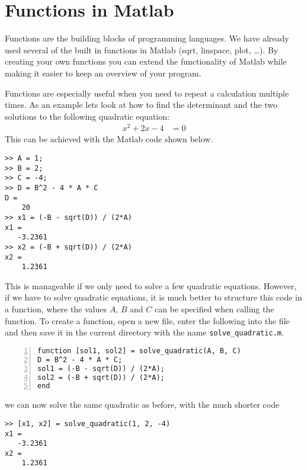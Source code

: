 \section{Functions in Matlab}

Functions are the building blocks of programming languages.
We have already used several of the built in functions 
in Matlab (sqrt, linspace, plot, \ldots). 
By creating your own functions you can extend the functionality of 
Matlab while making it easier to keep an overview of your program.

Functions are especially useful when you need to repeat a calculation 
multiple times.
As an example lets look at how to find the determinant and the two solutions 
to the following quadratic equation: 
\begin{align*}
x^2 + 2x - 4 &= 0 
\end{align*}
This can be achieved with the Matlab code shown below.
\begin{lstlisting}
>> A = 1; 
>> B = 2; 
>> C = -4;
>> D = B^2 - 4 * A * C
D =
    20
>> x1 = (-B - sqrt(D)) / (2*A)
x1 =
   -3.2361
>> x2 = (-B + sqrt(D)) / (2*A)
x2 =
    1.2361
\end{lstlisting}
This is manageable if we only need to solve a few quadratic equations.
However, if we have to solve quadratic equations, it is much better to 
structure this code in a function, where the values $A$, $B$ and $C$ can be 
specified when calling the function.
To create a function, open a new file, enter the following into the file 
and then save it in the current directory with the name 
\verb!solve_quadratic.m!.
\begin{lstlisting}[numbers=left]
function [sol1, sol2] = solve_quadratic(A, B, C)
D = B^2 - 4 * A * C;
sol1 = (-B - sqrt(D)) / (2*A);
sol2 = (-B + sqrt(D)) / (2*A);
end
\end{lstlisting}
we can now solve the same quadratic as before, with the much shorter code
\begin{lstlisting}
>> [x1, x2] = solve_quadratic(1, 2, -4)
x1 =
   -3.2361
x2 =
    1.2361
\end{lstlisting}

